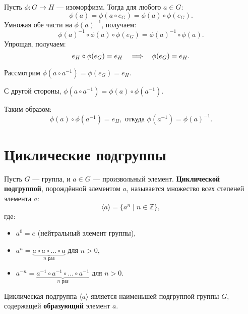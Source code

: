 Пусть \( \phi: G \to H \) — изоморфизм. Тогда для любого \( a \in G \):
\[
\phi(a) = \phi(a \circ e_G) = \phi(a) \circ \phi(e_G).
\]
Умножая обе части на \( \phi(a)^{-1} \), получаем:
\[
\phi(a)^{-1} \circ \phi(a) \circ \phi(e_G) = \phi(a)^{-1} \circ \phi(a).
\]
Упрощая, получаем:
\[
e_H \circ \phi(e_G) = e_H \quad \Longrightarrow \quad \phi(e_G) = e_H.
\]


Рассмотрим \( \phi(a \circ a^{-1}) = \phi(e_G) = e_H \).

С другой стороны, \( \phi(a \circ a^{-1}) = \phi(a) \circ \phi(a^{-1}) \).

Таким образом:
\[
\phi(a) \circ \phi(a^{-1}) = e_H, \text{ откуда } \phi(a^{-1}) = \phi(a)^{-1}.
\]

\section{Циклические подгруппы}

\begin{shdef}
    \begin{definition} 
    \leavevmode \nl

    Пусть \( G \) — группа, и \( a \in G \) — произвольный элемент. \textbf{Циклической подгруппой}, порождённой элементом \( a \), называется множество всех степеней элемента \( a \):
    \[
    \langle a \rangle = \{ a^n \mid n \in \mathbb{Z} \},
    \]
    где:
    \begin{itemize}
        \item \( a^0 = e \) (нейтральный элемент группы),
        \item \( a^n = \underbrace{a \circ a \circ \dots \circ a}_{n \text{ раз}} \) для \( n > 0 \),
        \item \( a^{-n} = \underbrace{a^{-1} \circ a^{-1} \circ \dots \circ a^{-1}}_{n \text{ раз}} \) для \( n > 0 \).
    \end{itemize}

    Циклическая подгруппа \( \langle a \rangle \) является наименьшей подгруппой группы \( G \), \\содержащей \textbf{образующий} элемент \( a \).
    \end{definition}
\end{shdef}

